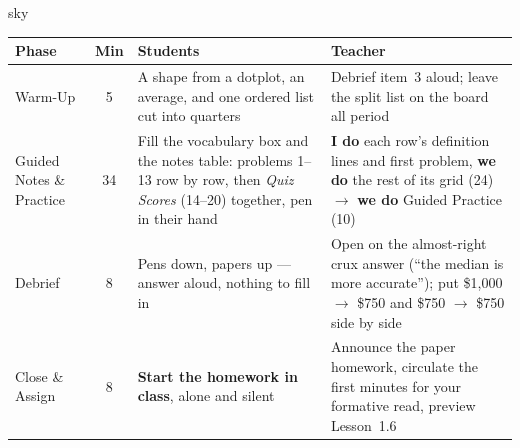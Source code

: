 \documentclass[10pt]{article}
\begin{document}
\boxguard[30]
\begin{skillbox}{sky}
\renewcommand{\arraystretch}{1.25}
\begin{tabularx}{\linewidth}{@{}l c X X@{}}
\textbf{Phase} & \textbf{Min} & \textbf{Students} & \textbf{Teacher} \\
\hline
Warm-Up & 5 & A shape from a dotplot, an average, and one ordered list cut into quarters & Debrief item~3 aloud; leave the split list on the board all period \\
Guided Notes \& Practice & 34 & Fill the vocabulary box and the notes table: problems 1--13 row by row, then \emph{Quiz Scores} (14--20) together, pen in their hand & \textbf{I do} each row's definition lines and first problem, \textbf{we do} the rest of its grid (24) $\to$ \textbf{we do} Guided Practice (10) \\
Debrief & 8 & Pens down, papers up --- answer aloud, nothing to fill in & Open on the almost-right crux answer (``the median is more accurate''); put \$1{,}000 $\to$ \$750 and \$750 $\to$ \$750 side by side \\
Close \& Assign & 8 & \textbf{Start the homework in class}, alone and silent & Announce the paper homework, circulate the first minutes for your formative read, preview Lesson~1.6 \\
\end{tabularx}
\end{skillbox}
\end{document}
